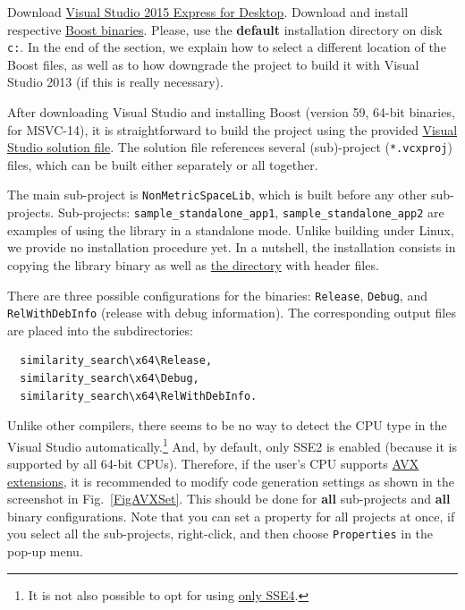 \documentclass[runningheads,a4paper]{llncs}
\newcommand{\replocdir}{https://github.com/searchivarius/NonMetricSpaceLib/tree/pserv}
\newcommand{\replocfile}{https://github.com/searchivarius/NonMetricSpaceLib/blob/pserv/}
\newcommand{\ttt}[1]{\texttt{#1}}
\begin{document}
{Download \href{https://www.visualstudio.com/en-us/downloads/download-visual-studio-vs.aspx}{Visual Studio 2015 Express for Desktop}. 
Download and install respective \href{http://sourceforge.net/projects/boost/files/boost-binaries/1.59.0/boost_1_59_0-msvc-14.0-64.exe/download}{Boost binaries}. Please, use the \textbf{default} installation directory on disk \ttt{c:}.
In the end of the section, we explain how to select a different location of the Boost files,
as well as to how downgrade the project to build it with Visual Studio 2013 (if this is really necessary). 

After downloading Visual Studio and installing Boost (version 59, 64-bit binaries, for MSVC-14), it is straightforward to build the project
using the provided \href{\replocfile similarity_search/NonMetricSpaceLib.sln}{Visual Studio 
solution file}.
The solution file references several (sub)-project (\ttt{*.vcxproj}) files,
which can be built either separately or all together.

The main sub-project is \ttt{NonMetricSpaceLib}, which is built before any other sub-projects. 
Sub-projects: 
\ttt{sample\_standalone\_app1},
\ttt{sample\_standalone\_app2} 
are examples of using the library in a standalone mode.
Unlike building under Linux, we provide no installation procedure yet.
In a nutshell, the installation consists in copying the library binary
as well as \href{\replocdir similarity_search/include}{the directory} with header files.

There are three possible configurations for the binaries: 
\ttt{Release}, \ttt{Debug}, and \ttt{RelWithDebInfo} (release with debug information). 
The corresponding output files are placed into the subdirectories:
\begin{verbatim}
  similarity_search\x64\Release,
  similarity_search\x64\Debug,
  similarity_search\x64\RelWithDebInfo.
\end{verbatim}

Unlike other compilers, there seems to be no way to detect the CPU type in the Visual Studio automatically.\footnote{It is not also possible to opt for using \href{http://en.wikipedia.org/wiki/SSE4}{only SSE4}.}
And, by default, only SSE2 is enabled (because it is supported by all 64-bit CPUs).
Therefore, if the user's CPU supports \href{https://en.wikipedia.org/wiki/Advanced_Vector_Extensions}{AVX extensions}, it is recommended to modify code generation settings as shown in the screenshot in Fig.~\ref{FigAVXSet}.
This should be done for \textbf{all} sub-projects and \textbf{all} binary configurations.
Note that you can set a property for all projects at once, if you select all the sub-projects, right-click, and then choose \ttt{Properties} 
in the pop-up menu.

}
\end{document}
